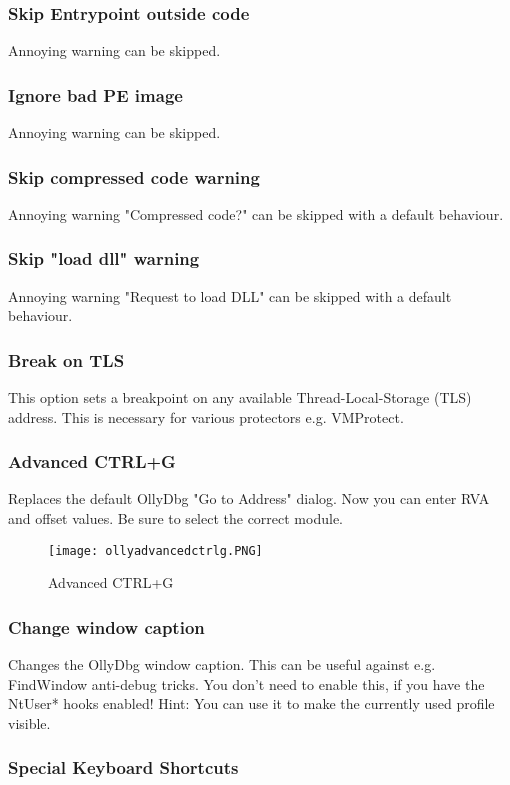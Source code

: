 \documentclass[10pt,a4paper]{article}
\begin{document}
\subsubsection{Skip Entrypoint outside code}
Annoying warning can be skipped.
\subsubsection{Ignore bad PE image}
Annoying warning can be skipped.
\subsubsection{Skip compressed code warning}
Annoying warning "Compressed code?" can be skipped with a default behaviour.
\subsubsection{Skip "load dll" warning}
Annoying warning "Request to load DLL" can be skipped with a default behaviour.
\subsubsection{Break on TLS}
This option sets a breakpoint on any available Thread-Local-Storage (TLS) address. This is necessary for various protectors e.g. VMProtect.
\subsubsection{Advanced CTRL+G}
Replaces the default OllyDbg "Go to Address" dialog. Now you can enter RVA and offset values. Be sure to select the correct module.

\begin{figure}[H]
\centering
\texttt{[image: ollyadvancedctrlg.PNG]}
\caption{Advanced CTRL+G}
\end{figure}

\subsubsection{Change window caption}
Changes the OllyDbg window caption. This can be useful against e.g. FindWindow anti-debug tricks. You don't need to enable this, if you have the NtUser* hooks enabled! Hint: You can use it to make the currently used profile visible.

\subsubsection{Special Keyboard Shortcuts}
\end{document}
